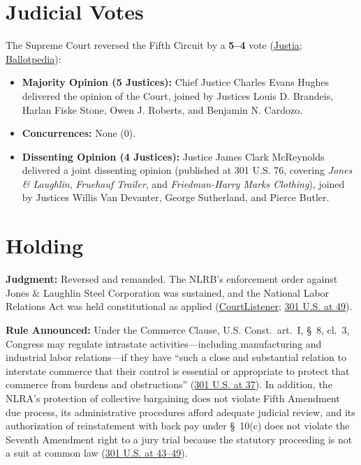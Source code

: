 \documentclass[12pt]{article}
\begin{document}
\section{Judicial Votes}

The Supreme Court reversed the Fifth Circuit by a \textbf{5--4} vote (\href{https://supreme.justia.com/cases/federal/us/301/1/}{Justia}; \href{https://ballotpedia.org/National_Labor_Relations_Board_v._Jones_\%26_Laughlin_Steel_Corporation}{Ballotpedia}):

\begin{itemize}
\item \textbf{Majority Opinion (5 Justices):} Chief Justice Charles Evans Hughes delivered the opinion of the Court, joined by Justices Louis D. Brandeis, Harlan Fiske Stone, Owen J. Roberts, and Benjamin N. Cardozo.
\item \textbf{Concurrences:} None (0).
\item \textbf{Dissenting Opinion (4 Justices):} Justice James Clark McReynolds delivered a joint dissenting opinion (published at 301 U.S. 76, covering \textit{Jones \& Laughlin}, \textit{Fruehauf Trailer}, and \textit{Friedman-Harry Marks Clothing}), joined by Justices Willis Van Devanter, George Sutherland, and Pierce Butler.
\end{itemize}

\section{Holding}

\textbf{Judgment:} Reversed and remanded. The NLRB's enforcement order against Jones \& Laughlin Steel Corporation was sustained, and the National Labor Relations Act was held constitutional as applied (\href{https://www.courtlistener.com/opinion/102804/national-labor-relations-board-v-jones-laughlin-steel-corp/}{CourtListener}; \href{https://supreme.justia.com/cases/federal/us/301/1/}{301 U.S. at 49}).

\textbf{Rule Announced:} Under the Commerce Clause, U.S. Const.\ art.\ I, \S~8, cl.\ 3, Congress may regulate intrastate activities---including manufacturing and industrial labor relations---if they have ``such a close and substantial relation to interstate commerce that their control is essential or appropriate to protect that commerce from burdens and obstructions'' (\href{https://supreme.justia.com/cases/federal/us/301/1/}{301 U.S. at 37}). In addition, the NLRA's protection of collective bargaining does not violate Fifth Amendment due process, its administrative procedures afford adequate judicial review, and its authorization of reinstatement with back pay under \S~10(c) does not violate the Seventh Amendment right to a jury trial because the statutory proceeding is not a suit at common law (\href{https://supreme.justia.com/cases/federal/us/301/1/}{301 U.S. at 43--49}).
\end{document}
